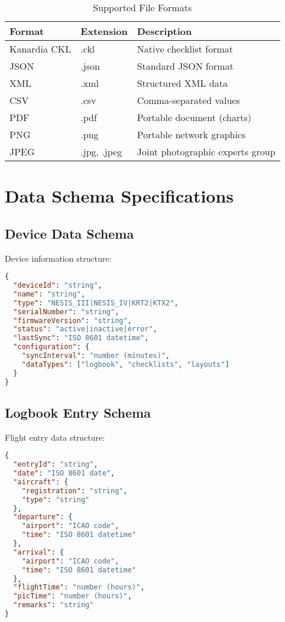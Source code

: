 \begin{table}[H]
\centering
\begin{tabular}{@{}llp{6cm}@{}}
\toprule
\textbf{Format} & \textbf{Extension} & \textbf{Description} \\
\midrule
Kanardia CKL & .ckl & Native checklist format \\
JSON & .json & Standard JSON format \\
XML & .xml & Structured XML data \\
CSV & .csv & Comma-separated values \\
PDF & .pdf & Portable document (charts) \\
PNG & .png & Portable network graphics \\
JPEG & .jpg, .jpeg & Joint photographic experts group \\
\bottomrule
\end{tabular}
\caption{Supported File Formats}
\label{tab:file_formats}
\end{table}

\section{Data Schema Specifications}

\subsection{Device Data Schema}

Device information structure:

\begin{lstlisting}[language=json]
{
  "deviceId": "string",
  "name": "string",
  "type": "NESIS_III|NESIS_IV|KRT2|KTX2",
  "serialNumber": "string",
  "firmwareVersion": "string",
  "status": "active|inactive|error",
  "lastSync": "ISO 8601 datetime",
  "configuration": {
    "syncInterval": "number (minutes)",
    "dataTypes": ["logbook", "checklists", "layouts"]
  }
}
\end{lstlisting}

\subsection{Logbook Entry Schema}

Flight entry data structure:

\begin{lstlisting}[language=json]
{
  "entryId": "string",
  "date": "ISO 8601 date",
  "aircraft": {
    "registration": "string",
    "type": "string"
  },
  "departure": {
    "airport": "ICAO code",
    "time": "ISO 8601 datetime"
  },
  "arrival": {
    "airport": "ICAO code", 
    "time": "ISO 8601 datetime"
  },
  "flightTime": "number (hours)",
  "picTime": "number (hours)",
  "remarks": "string"
}
\end{lstlisting}
